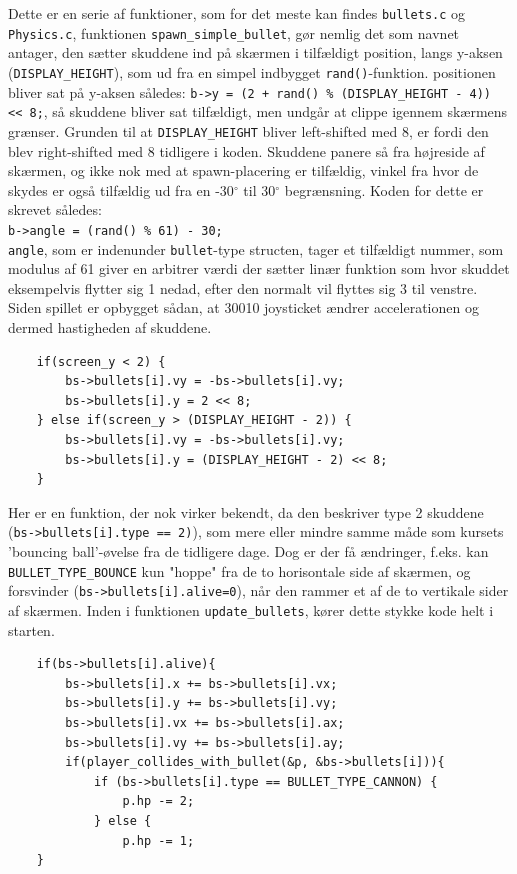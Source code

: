 Dette er en serie af funktioner, som for det meste kan findes \lstinline!bullets.c! og \lstinline!Physics.c!, funktionen \lstinline!spawn_simple_bullet!, gør nemlig det som navnet antager, den sætter skuddene ind på skærmen i tilfældigt position, langs y-aksen (\lstinline!DISPLAY_HEIGHT!), som ud fra en simpel indbygget \lstinline!rand()!-funktion. positionen bliver sat på y-aksen således: \lstinline!b->y = (2 + rand() % (DISPLAY_HEIGHT - 4)) << 8;!, så skuddene bliver sat tilfældigt, men undgår at clippe igennem skærmens grænser. Grunden til at \lstinline!DISPLAY_HEIGHT! bliver left-shifted med 8, er fordi den blev right-shifted med 8 tidligere i koden. Skuddene panere så fra højreside af skærmen, og ikke nok med at spawn-placering er tilfældig, vinkel fra hvor de skydes er også tilfældig ud fra en -30$^{\circ}$ til 30$^{\circ}$ begrænsning. Koden for dette er skrevet således:\\
\lstinline!b->angle = (rand() % 61) - 30;!\\
\lstinline!angle!, som er indenunder \lstinline!bullet!-type structen, tager et tilfældigt nummer, som modulus af 61 giver en arbitrer værdi der sætter linær funktion som hvor skuddet eksempelvis flytter sig 1 nedad, efter den normalt vil flyttes sig 3 til venstre. Siden spillet er opbygget sådan, at 30010 joysticket ændrer accelerationen og dermed hastigheden af skuddene.\\

\begin{lstlisting}
    if(screen_y < 2) {
        bs->bullets[i].vy = -bs->bullets[i].vy;
        bs->bullets[i].y = 2 << 8;
    } else if(screen_y > (DISPLAY_HEIGHT - 2)) {
        bs->bullets[i].vy = -bs->bullets[i].vy;
        bs->bullets[i].y = (DISPLAY_HEIGHT - 2) << 8;
    }
\end{lstlisting}
\vspace{-2em}

Her er en funktion, der nok virker bekendt, da den beskriver type 2 skuddene (\lstinline!bs->bullets[i].type == 2)!), som mere eller mindre samme måde som kursets 'bouncing ball'-øvelse fra de tidligere dage. Dog er der få ændringer, f.eks. kan \lstinline!BULLET_TYPE_BOUNCE! kun "hoppe" fra de to horisontale side af skærmen, og forsvinder (\lstinline!bs->bullets[i].alive=0!), når den rammer et af de to vertikale sider af skærmen. Inden i funktionen \lstinline!update_bullets!, kører dette stykke kode helt i starten.\\

\begin{lstlisting}
    if(bs->bullets[i].alive){
        bs->bullets[i].x += bs->bullets[i].vx;
        bs->bullets[i].y += bs->bullets[i].vy;
        bs->bullets[i].vx += bs->bullets[i].ax;
        bs->bullets[i].vy += bs->bullets[i].ay;
        if(player_collides_with_bullet(&p, &bs->bullets[i])){
            if (bs->bullets[i].type == BULLET_TYPE_CANNON) {
                p.hp -= 2;
            } else {
                p.hp -= 1;
    }
\end{lstlisting}
\vspace{-2em}


